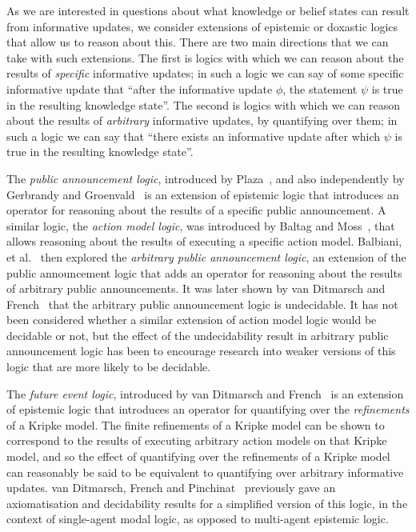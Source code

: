 As we are interested in questions about what knowledge or belief states can
result from informative updates, we consider extensions of epistemic or doxastic
logics that allow us to reason about this. There are two main directions that we
can take with such extensions. The first is logics with which we can reason
about the results of {\em specific} informative updates; in such a logic we can
say of some specific informative update that ``after the informative update
$\phi$, the statement $\psi$ is true in the resulting knowledge state''. The
second is logics with which we can reason about the results of {\em arbitrary}
informative updates, by quantifying over them; in such a logic we can say
that ``there exists an informative update after which $\psi$ is true in the
resulting knowledge state''.

The {\em public announcement logic}, introduced by
Plaza~\cite{plaza2007logics}, and also independently by Gerbrandy and
Groenvald~\cite{gerbrandy1997reasoning} is an extension of epistemic logic that
introduces an operator for reasoning about the results of a specific public
announcement. A similar logic, the {\em action model logic}, was introduced by
Baltag and Moss~\cite{baltag2004logics}, that allows reasoning about the
results of executing a specific action model. Balbiani, et
al.~\cite{balbiani2007arbitrary} then explored the {\em arbitrary public
announcement logic}, an extension of the public announcement logic that adds
an operator for reasoning about the results of arbitrary public announcements.
It was later shown by van Ditmarsch and French~\cite{french2008undecidability}
that the arbitrary public announcement logic is undecidable. It has not been
considered whether a similar extension of action model logic would be decidable
or not, but the effect of the undecidability result in arbitrary public
announcement logic has been to encourage research into weaker versions of this
logic that are more likely to be decidable.

The {\em future event logic}, introduced by van Ditmarsch and
French~\cite{french2009simulation} is an extension of epistemic logic that
introduces an operator for quantifying over the {\em refinements} of a Kripke
model. The finite refinements of a Kripke model can be shown to correspond to
the results of executing arbitrary action models on that Kripke model, and so
the effect of quantifying over the refinements of a Kripke model can reasonably
be said to be equivalent to quantifying over arbitrary informative updates. van
Ditmarsch, French and Pinchinat~\cite{french2010future} previously gave an
axiomatisation and decidability results for a simplified version of this logic,
in the context of single-agent modal logic, as opposed to multi-agent epistemic
logic.

